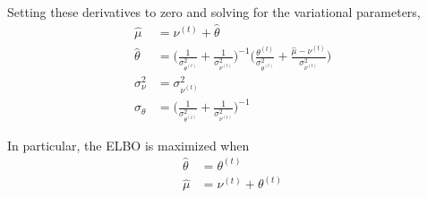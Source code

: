\documentclass[10pt]{article}
\theoremstyle{plain}
\theoremstyle{definition}
\newcommand{\<}{\langle}
\renewcommand{\>}{\rangle}
\begin{document}
Setting these derivatives to zero and solving for the variational parameters, 
\begin{align}
\hat \mu &= \nu^{(t)} + \hat\theta\\
\hat \theta &= \Big(\frac{1}{\sigma^2_{\theta^{(t)}}}  + \frac{1}{\sigma^2_{\nu^{(t)}} }\Big)^{-1}\Big(\frac{\theta^{(t)}}{\sigma^2_{\theta^{(t)}}} + \frac{\hat\mu  - \nu^{(t)}}{\sigma^2_{\nu^{(t)}}}\Big)\\
\sigma_\nu^2 &= \sigma^2_{\nu^{(t)}}\\
\sigma_\theta &= \Big(\frac{1}{\sigma^2_{\theta^{(t)}}}  + \frac{1}{\sigma^2_{\nu^{(t)}} }\Big)^{-1}
\end{align}

In particular, the ELBO is maximized when 
\begin{align*} 
\hat\theta &= \theta^{(t)}\\
\hat \mu &=  \nu^{(t)} + \theta^{(t)}
\end{align*}
\end{document}

